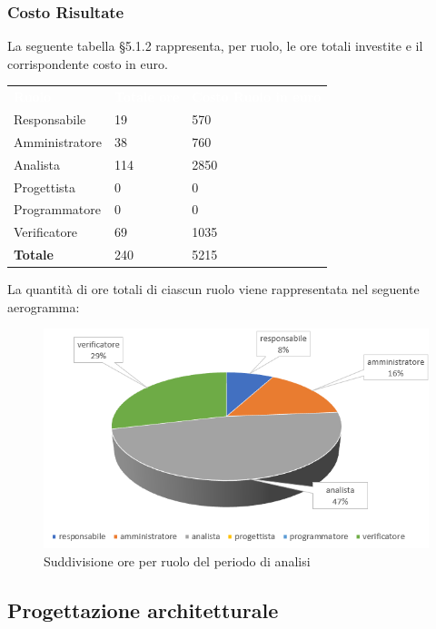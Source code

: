 \subsubsection{Costo Risultate}
La seguente tabella §5.1.2 rappresenta, per ruolo, le ore totali investite e il corrispondente costo in euro.
{
	\renewcommand{\arraystretch}{2}
	\centering
	\begin{longtable}{ C{3cm} C{2cm} C{4cm}}
		\textcolor{white}{\textbf{Ruolo}} & \textcolor{white}{\textbf{Totale ore}} & \textcolor{white}{\textbf{Costo Ruolo in euro}}\\	
        
        Responsabile & 19 & 570\\
        Amministratore & 38 & 760\\
        Analista & 114 & 2850 \\
        Progettista & 0 & 0 \\
        Programmatore & 0 & 0 \\
        Verificatore & 69 & 1035 \\
        \textbf{Totale} & 240 & 5215 \\
		
	\end{longtable}
}

La quantità di ore totali di ciascun ruolo viene rappresentata nel seguente aerogramma:

\begin{figure}[h]
	\centering
	\includegraphics[scale=0.45]{sezioni/Aerogrammi/AerogrammaAnalisi.png}
	\caption{Suddivisione ore per ruolo del periodo di analisi}
\end{figure}

\subsection{Progettazione architetturale}

